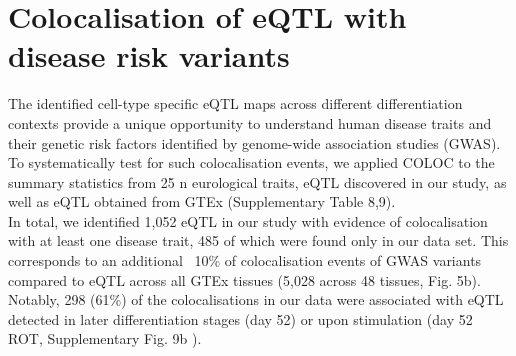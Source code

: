 

\clearpage

\section{Colocalisation of eQTL with disease risk variants}

The identified cell-type specific eQTL maps across different differentiation contexts provide a unique opportunity to understand human disease traits and their genetic risk factors identified by genome-wide association studies (GWAS). 
To systematically test for such colocalisation events, we applied COLOC \cite{giambartolomei2014bayesian} to the summary statistics from 25 n eurological traits, eQTL discovered in our study, as well as eQTL obtained from GTEx (Supplementary Table 8,9).\\

In total, we identified 1,052 eQTL in our study with evidence of colocalisation with at least one disease trait, 485 of which were found only in our data set. 
This corresponds to an additional ~10\% of colocalisation events of GWAS variants compared to eQTL across all GTEx tissues (5,028 across 48 tissues, Fig. 5b). 
Notably, 298 (61\%) of the colocalisations in our data were associated with eQTL detected in later differentiation stages (day 52) or upon stimulation (day 52 ROT, Supplementary Fig. 9b ).\\

